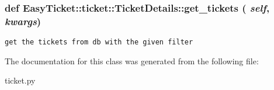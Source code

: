 \subsubsection{\setlength{\rightskip}{0pt plus 5cm}def Easy\-Ticket::ticket::Ticket\-Details::get\_\-tickets ( {\em self},  {\em kwargs})}\label{d0/d58/classEasyTicket_1_1ticket_1_1TicketDetails_9b40fb0241e443ad0d48c7ec0468ea96}




\footnotesize\begin{verbatim}get the tickets from db with the given filter
\end{verbatim}
\normalsize
 

The documentation for this class was generated from the following file:\begin{CompactItemize}
\item 
ticket.py\end{CompactItemize}
